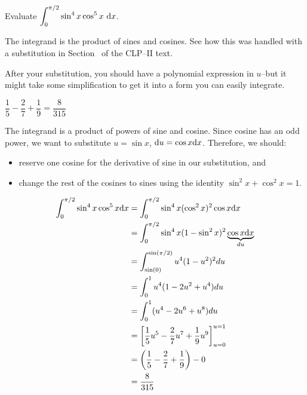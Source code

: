 \subsection*{\Procedural}

\begin{question} Evaluate
$\displaystyle\int_0^{{\pi}/{2}} \sin^4 x \cos^5 x~ \mathrm{d}x$.
\end{question}

\begin{hint}
The integrand is the product of sines and cosines. See how this was handled with a substitution in Section~ of the CLP--II text.%

After your substitution, you should have a polynomial expression in $u$--but it might take some simplification to get it into a form you can easily integrate.
\end{hint}

\begin{answer}
$\dfrac{1}{5}-\dfrac{2}{7}+\dfrac{1}{9}
=\dfrac{8}{315}$
\end{answer}

\begin{solution}

The integrand is a product of powers of sine and cosine. Since cosine has an odd power, we want to substitute $u=\sin x$, $\mathrm{d}u=\cos x \mathrm{d}x$. Therefore, we should:
\begin{itemize}
\item reserve one cosine for the derivative of sine in our substitution, and
\item change the rest of the cosines to sines using the identity $\sin^2x+\cos^2x=1$.
\end{itemize}
\begin{align*}
\int_0^{\pi/2}\sin^4x\cos^5x\mathrm{d}x&=
\int_{0}^{\pi/2}\sin^4x(\cos^2x)^2\cos x\mathrm{d}x\\
&=\int_{0}^{\pi/2}\sin^4x(1-\sin^2x)^2\underbrace{\cos x\mathrm{d}x}_{du}\\
&=
\int_{\sin(0)}^{\sin(\pi/2)}u^4(1-u^2)^2du\\
&=
\int_{0}^{1}u^4(1-2u^2+u^4)du\\
&=
\int_{0}^{1}(u^4-2u^6+u^8)du\\
&=\left[
\frac{1}{5}u^5-\frac{2}{7}u^7+\frac{1}{9}u^9
\right]_{u=0}^{u=1}\\
&=
\left(\frac{1}{5}-\frac{2}{7}+\frac{1}{9}\right)
-
0\\
&=\dfrac{8}{315}
\end{align*}
\end{solution}



